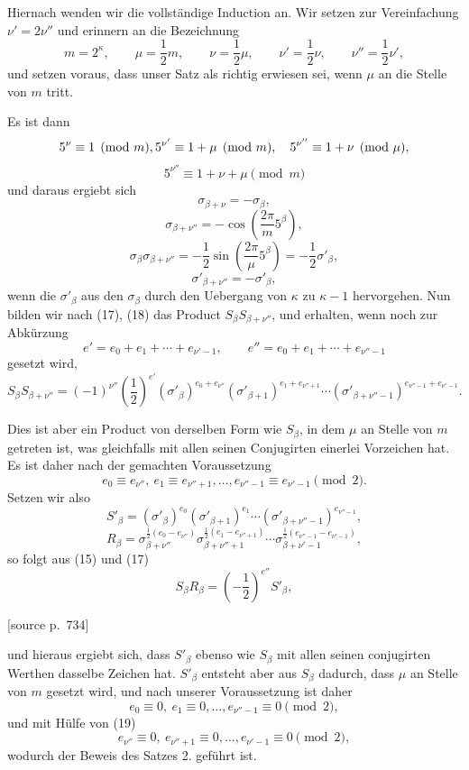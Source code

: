 \documentclass[11pt]{article}
\newcommand{\srcpage}[1]{\par\medskip\noindent\textsf{[source p.~#1]}\par\smallskip}
\begin{document}
Hiernach wenden wir die vollständige Induction an. Wir setzen zur Vereinfachung $\nu'=2\nu''$ und erinnern an die Bezeichnung
\begin{equation}
m=2^\kappa,\qquad \mu=\frac12m,\qquad \nu=\frac12\mu,
\qquad \nu'=\frac12\nu,
\qquad \nu''=\frac12\nu',
\tag{16}
\end{equation}
und setzen voraus, dass unser Satz als richtig erwiesen sei, wenn $\mu$ an die Stelle von $m$ tritt.

Es ist dann
\[
5^\nu\equiv1\pmod m,\\ 5^{\nu'}\equiv1+\mu\pmod m,
\quad 5^{\nu''}\equiv1+\nu\pmod\mu,
\]
\[
5^{\nu''}\equiv1+\nu+\mu\pmod m
\]
und daraus ergiebt sich
\[
\sigma_{\beta+\nu}=-\sigma_\beta,
\]
\[
\sigma_{\beta+\nu''}=-\cos\left(\frac{2\pi}{m}5^\beta\right),
\]
\begin{equation}
\sigma_\beta\sigma_{\beta+\nu''}=-\frac12\sin\left(\frac{2\pi}{\mu}5^\beta\right)=-\frac12\sigma'_\beta,
\tag{17}
\end{equation}
\begin{equation}
\sigma'_{\beta+\nu''}=-\sigma'_\beta,
\tag{18}
\end{equation}
wenn die $\sigma'_\beta$ aus den $\sigma_\beta$ durch den Uebergang von $\kappa$ zu $\kappa-1$ hervorgehen. Nun bilden wir nach (17), (18) das Product $S_\beta S_{\beta+\nu''}$, und erhalten, wenn noch zur Abkürzung
\[
e'=e_0+e_1+\cdots+e_{\nu'-1},
\qquad e''=e_0+e_1+\cdots+e_{\nu''-1}
\]
gesetzt wird,
\[
S_\beta S_{\beta+\nu''}=(-1)^{\nu''}\left(\frac12\right)^{e'}
(\sigma'_\beta)^{e_0+e_{\nu''}}(\sigma'_{\beta+1})^{e_1+e_{\nu''+1}}\cdots
(\sigma'_{\beta+\nu''-1})^{e_{\nu''-1}+e_{\nu'-1}}.
\]

Dies ist aber ein Product von derselben Form wie $S_\beta$, in dem $\mu$ an Stelle von $m$ getreten ist, was gleichfalls mit allen seinen Conjugirten einerlei Vorzeichen hat. Es ist daher nach der gemachten Voraussetzung
\begin{equation}
e_0\equiv e_{\nu''},\ e_1\equiv e_{\nu''+1},\ldots,e_{\nu''-1}\equiv e_{\nu'-1}\pmod2.
\tag{19}
\end{equation}
Setzen wir also
\[
S'_\beta=(\sigma'_\beta)^{e_0}(\sigma'_{\beta+1})^{e_1}\cdots(\sigma'_{\beta+\nu''-1})^{e_{\nu''-1}},
\]
\[
R_\beta=\sigma_{\beta+\nu''}^{\frac12(e_0-e_{\nu''})}
\sigma_{\beta+\nu''+1}^{\frac12(e_1-e_{\nu''+1})}\cdots
\sigma_{\beta+\nu'-1}^{\frac12(e_{\nu''-1}-e_{\nu'-1})},
\]
so folgt aus (15) und (17)
\[
S_\beta R_\beta=\left(-\frac12\right)^{e''}S'_\beta,
\]
\srcpage{734}
und hieraus ergiebt sich, dass $S'_\beta$ ebenso wie $S_\beta$ mit allen seinen conjugirten Werthen dasselbe Zeichen hat. $S'_\beta$ entsteht aber aus $S_\beta$ dadurch, dass $\mu$ an Stelle von $m$ gesetzt wird, und nach unserer Voraussetzung ist daher
\[
e_0\equiv0,\ e_1\equiv0,\ldots,e_{\nu''-1}\equiv0\pmod2,
\]
und mit Hülfe von (19)
\[
e_{\nu''}\equiv0,\ e_{\nu''+1}\equiv0,\ldots,e_{\nu'-1}\equiv0\pmod2,
\]
wodurch der Beweis des Satzes 2. geführt ist.
\end{document}
